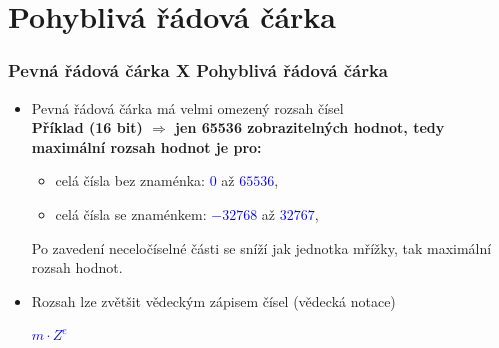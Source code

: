 \section{\texorpdfstring{Pohyblivá řádová čárka}{Pohybliva radova carka}}

  \begin{frame}
    \frametitle{Pevná řádová čárka X Pohyblivá řádová čárka}
    \boldmath
    
    \begin{itemize}
      \item Pevná řádová čárka má velmi omezený rozsah čísel \\
      \textbf{Příklad (16 bit) $\Longrightarrow$ jen 65536 zobrazitelných hodnot, tedy maximální rozsah hodnot je pro:}
      \vspace{2mm}
      \begin{itemize}
        \item celá čísla bez znaménka: \textcolor{blue}{$0$} až \textcolor{blue}{$65536$},
        \item celá čísla se znaménkem: \textcolor{blue}{$-32768$} až \textcolor{blue}{$32767$},
      \end{itemize}
      Po zavedení neceločíselné části se sníží jak jednotka mřížky, tak maximální rozsah hodnot.
      \vspace{3mm}
      \item Rozsah lze zvětšit vědeckým zápisem čísel (vědecká notace)
      \begin{center}
        \textcolor{blue}{$m\cdot Z^{e}$}
      \end{center}
    \end{itemize}
	\end{frame}

